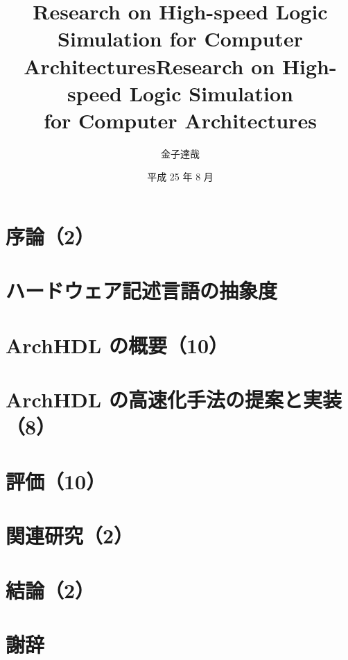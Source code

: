 \documentclass[12pt,openany,papersize,]{jsbook}
\title{Research on High-speed Logic Simulation for Computer Architectures}
\affiliation{情報工学科}
\title{Research on High-speed Logic Simulation \\ for Computer Architectures}
\author{金子達哉}
\date{平成 25 年 8 月}
\begin{document}
\maketitle

\frontmatter

\tableofcontents

\mainmatter

\chapter{序論（2）}



 \chapter{ハードウェア記述言語の抽象度} \fi

\chapter{ArchHDL の概要（10）}

\label{c:summary}



\chapter{ArchHDL の高速化手法の提案と実装（8）}

\label{c:method}



\chapter{評価（10）}

\label{c:evaluation}



\chapter{関連研究（2）}

\chapter{結論（2）}

\label{c:conclusion}



\backmatter

\chapter{謝辞}

\label{c:acknowledgment}



\label{c:relatedwork}


\end{document}
